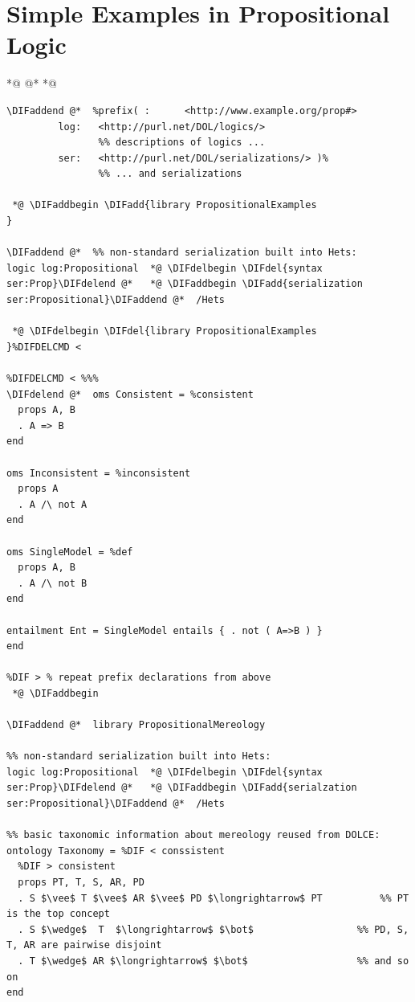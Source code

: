 \documentclass[10pt,fleqn,final]{scrreprt}
\newcommand{\sclause}[1]{\section{#1}}
\providecommand{\DIFadd}[1]{{\protect\color{blue}\uwave{#1}}} %
\providecommand{\DIFdel}[1]{{\protect\color{red}\sout{#1}}}                      %
\providecommand{\DIFaddbegin}{} %
\providecommand{\DIFaddend}{} %
\providecommand{\DIFdelbegin}{} %
\providecommand{\DIFdelend}{} %
\begin{document}
\sclause{Simple Examples in Propositional Logic} *@ \DIFdelbegin %
\DIFdelend @*   *@ \DIFaddbegin \label{ex:prop}
\begin{lstlisting}[basicstyle=\ttfamily,language=dolText,alsolanguage=prop,escapechar=@,mathescape]
\DIFaddend @*  %prefix( :      <http://www.example.org/prop#>
         log:   <http://purl.net/DOL/logics/>
                %% descriptions of logics ...
         ser:   <http://purl.net/DOL/serializations/> )%
                %% ... and serializations

 *@ \DIFaddbegin \DIFadd{library PropositionalExamples
}

\DIFaddend @*  %% non-standard serialization built into Hets: 
logic log:Propositional  *@ \DIFdelbegin \DIFdel{syntax ser:Prop}\DIFdelend @*   *@ \DIFaddbegin \DIFadd{serialization ser:Propositional}\DIFaddend @*  /Hets       

 *@ \DIFdelbegin \DIFdel{library PropositionalExamples
}%DIFDELCMD < 

%DIFDELCMD < %%%
\DIFdelend @*  oms Consistent = %consistent
  props A, B
  . A => B
end

oms Inconsistent = %inconsistent
  props A
  . A /\ not A
end

oms SingleModel = %def
  props A, B
  . A /\ not B
end

entailment Ent = SingleModel entails { . not ( A=>B ) }
end

%DIF > % repeat prefix declarations from above
 *@ \DIFaddbegin 

\DIFaddend @*  library PropositionalMereology

%% non-standard serialization built into Hets: 
logic log:Propositional  *@ \DIFdelbegin \DIFdel{syntax ser:Prop}\DIFdelend @*   *@ \DIFaddbegin \DIFadd{serialzation ser:Propositional}\DIFaddend @*  /Hets

%% basic taxonomic information about mereology reused from DOLCE:
ontology Taxonomy = %DIF < conssistent      
  %DIF > consistent
  props PT, T, S, AR, PD
  . S $\vee$ T $\vee$ AR $\vee$ PD $\longrightarrow$ PT          %% PT is the top concept
  . S $\wedge$  T  $\longrightarrow$ $\bot$                  %% PD, S, T, AR are pairwise disjoint
  . T $\wedge$ AR $\longrightarrow$ $\bot$                   %% and so on
end
\end{lstlisting}
\end{document}
